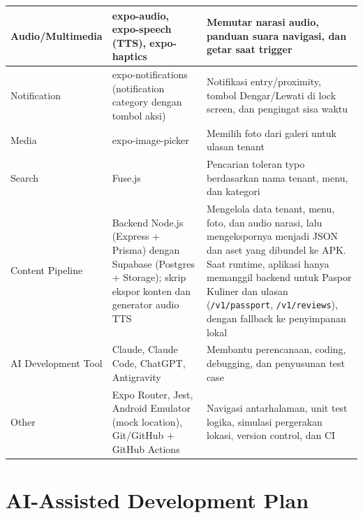 \begin{longtable}{|L{0.333}|L{0.333}|L{0.333}|}
Audio/Multimedia & expo-audio, expo-speech (TTS), expo-haptics & Memutar narasi audio, panduan suara navigasi, dan getar saat trigger \\ \hline
Notification & expo-notifications (notification category dengan tombol aksi) & Notifikasi entry/proximity, tombol Dengar/Lewati di lock screen, dan pengingat sisa waktu \\ \hline
Media & expo-image-picker & Memilih foto dari galeri untuk ulasan tenant \\ \hline
Search & Fuse.js & Pencarian toleran typo berdasarkan nama tenant, menu, dan kategori \\ \hline
Content Pipeline & Backend Node.js (Express + Prisma) dengan Supabase (Postgres + Storage); skrip ekspor konten dan generator audio TTS & Mengelola data tenant, menu, foto, dan audio narasi, lalu mengekspornya menjadi JSON dan aset yang dibundel ke APK. Saat runtime, aplikasi hanya memanggil backend untuk Paspor Kuliner dan ulasan (\texttt{/v1/passport}, \texttt{/v1/reviews}), dengan fallback ke penyimpanan lokal \\ \hline
AI Development Tool & Claude, Claude Code, ChatGPT, Antigravity & Membantu perencanaan, coding, debugging, dan penyusunan test case \\ \hline
Other & Expo Router, Jest, Android Emulator (mock location), Git/GitHub + GitHub Actions & Navigasi antarhalaman, unit test logika, simulasi pergerakan lokasi, version control, dan CI \\ \hline
\end{longtable}

\section{AI-Assisted Development Plan}

